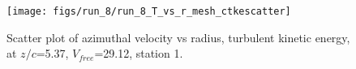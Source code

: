 \begin{figure}[H]
\centering
\texttt{[image: figs/run\_8/run\_8\_T\_vs\_r\_mesh\_ctkescatter]}
\caption{Scatter plot of azimuthal velocity vs radius, turbulent kinetic energy, at $z/c$=5.37, $V_{free}$=29.12, station 1.}
\label{fig:run_8_T_vs_r_mesh_ctkescatter}
\end{figure}


